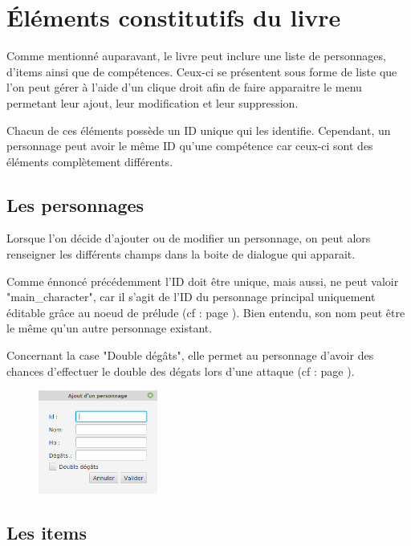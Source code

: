 \chapter{Éléments constitutifs du livre}

	\label{chapter:elementsConstitutifLivre}
	Comme mentionné auparavant, le livre peut inclure une liste de personnages, d'items ainsi que de compétences. Ceux-ci se présentent sous forme de liste que l'on peut gérer à l'aide d'un clique droit afin de faire apparaitre le menu permetant leur ajout, leur modification et leur suppression.

	Chacun de ces éléments possède un ID unique qui les identifie. Cependant, un personnage peut avoir le même ID qu'une compétence car ceux-ci sont des éléments complètement différents.

	\section{Les personnages}
		\label{sec:perso}

		Lorsque l'on décide d'ajouter ou de modifier un personnage, on peut alors renseigner les différents champs dans la boite de dialogue qui apparait.

		Comme énnoncé précédemment l'ID doit être unique, mais aussi, ne peut valoir "main\_character", car il s'agit de l'ID du personnage principal uniquement éditable grâce au noeud de prélude (cf :  page \pageref{subsec:main_character}). Bien entendu, son nom peut être le même qu'un autre personnage existant.

		Concernant la case "Double dégâts", elle permet au personnage d'avoir des chances d'effectuer le double des dégats lors d'une attaque (cf :  page \pageref{subsubsec:combat}).

		\begin{figure}[H]
			\centering\includegraphics[width=0.35\textwidth, keepaspectratio]{img/personnageDialog.png}
		\end{figure}

	\section{Les items}

